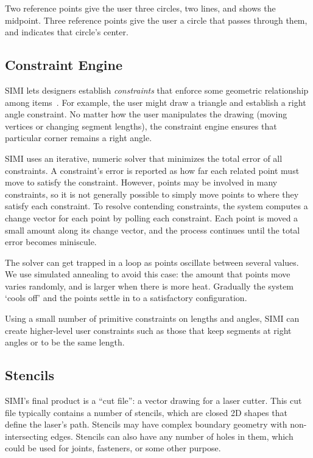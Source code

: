 \documentclass{article}
\begin{document}
Two reference points give the user three circles, two lines, and shows
the midpoint. Three reference points give the user a circle that
passes through them, and indicates that circle's center.

\subsection{Constraint Engine}

SIMI lets designers establish \textit{constraints} that enforce some
geometric relationship among items~\cite{borning-thinglab}. For
example, the user might draw a triangle and establish a right angle
constraint. No matter how the user manipulates the drawing (moving
vertices or changing segment lengths), the constraint engine ensures
that particular corner remains a right angle.

SIMI uses an iterative, numeric solver that minimizes the total error
of all constraints. A constraint's error is reported as how far each
related point must move to satisfy the constraint. However, points may
be involved in many constraints, so it is not generally possible to
simply move points to where they satisfy each constraint. To resolve
contending constraints, the system computes a change vector for each
point by polling each constraint. Each point is moved a small amount
along its change vector, and the process continues until the total
error becomes miniscule.

The solver can get trapped in a loop as points oscillate between
several values. We use simulated annealing to avoid this case: the
amount that points move varies randomly, and is larger when there is
more heat. Gradually the system `cools off' and the points settle in
to a satisfactory configuration.

Using a small number of primitive constraints on lengths and angles,
SIMI can create higher-level user constraints such as those that keep
segments at right angles or to be the same length.

\subsection{Stencils}

SIMI's final product is a ``cut file'': a vector drawing for a laser
cutter. This cut file typically contains a number of stencils, which
are closed 2D shapes that define the laser's path. Stencils may have
complex boundary geometry with non-intersecting edges. Stencils can
also have any number of holes in them, which could be used for joints,
fasteners, or some other purpose.
\end{document}

